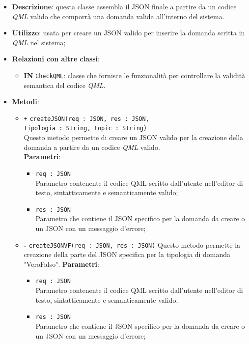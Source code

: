\begin{itemize}
	\item \textbf{Descrizione}: questa classe assembla il JSON finale a partire da un codice \textit{QML} valido che comporrà una domanda valida all'interno del sistema.
	\item \textbf{Utilizzo}: usata per creare un JSON valido per inserire la domanda scritta in \textit{QML} nel sistema;
	\item \textbf{Relazioni con altre classi}:
	\begin{itemize}
		\item \textbf{IN} \texttt{CheckQML}: classe che fornisce le funzionalità per controllare la validità semantica del codice \textit{QML}.
	\end{itemize}
	\item \textbf{Metodi}:
	\begin{itemize}
		\item \texttt{+} \texttt{createJSON(req : JSON, res : JSON, \\ tipologia : String, topic : String)} \\
		Questo metodo permette di creare un JSON valido per la creazione della domanda a partire da un codice \textit{QML} valido. \\
		\textbf{Parametri}:
		\begin{itemize}
			\item \texttt{req : JSON} \\
			Parametro contenente il codice QML scritto dall'utente nell'editor di testo, sintatticamente e semanticamente valido;
			\item \texttt{res : JSON} \\
			Parametro che contiene il JSON specifico per la domanda da creare o un JSON con un messaggio d'errore;
		\end{itemize}
		\item \textbf{-} \texttt{createJSONVF(req : JSON, res : JSON)}
		Questo metodo permette la creazione della parte del JSON specifica per la tipologia di domanda "VeroFalso".
		\textbf{Parametri}:
		\begin{itemize}
			\item \texttt{req : JSON} \\
			Parametro contenente il codice QML scritto dall'utente nell'editor di testo, sintatticamente e semanticamente valido;
			\item \texttt{res : JSON} \\
			Parametro che contiene il JSON specifico per la domanda da creare o un JSON con un messaggio d'errore;

\end{itemize}
\end{itemize}
\end{itemize}
